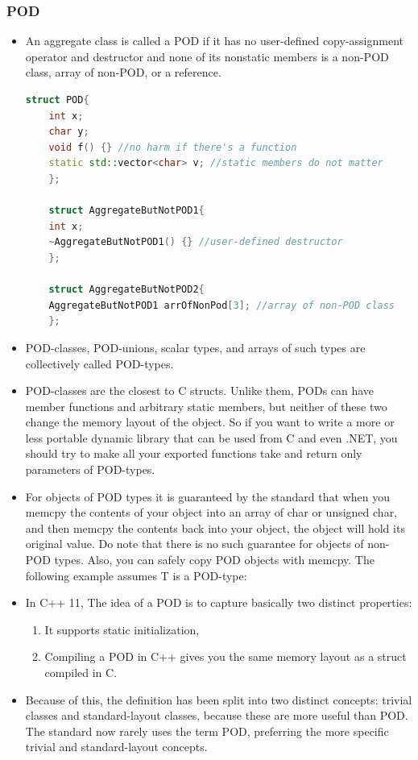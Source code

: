 \documentclass[a4paper,11pt,twoside]{book}
\begin{document}
\subsubsection{POD}
\begin{itemize}
	
	\item An aggregate class is called a POD if it has no user-defined copy-assignment operator and destructor and none of its nonstatic members is a non-POD class, array of non-POD, or a reference.
	
	\begin{lstlisting}[frame=single, language=c++]
	struct POD{
	int x;
	char y;
	void f() {} //no harm if there's a function
	static std::vector<char> v; //static members do not matter
	};
	
	struct AggregateButNotPOD1{
	int x;
	~AggregateButNotPOD1() {} //user-defined destructor
	};
	
	struct AggregateButNotPOD2{
	AggregateButNotPOD1 arrOfNonPod[3]; //array of non-POD class
	};
	\end{lstlisting}
	
	
	\item POD-classes, POD-unions, scalar types, and arrays of such types are collectively called POD-types.
	
	\item POD-classes are the closest to C structs. Unlike them, PODs can have member functions and arbitrary static members, but neither of these two change the memory layout of the object. So if you want to write a more or less portable dynamic library that can be used from C and even .NET, you should try to make all your exported functions take and return only parameters of POD-types.
	
	\item For objects of POD types it is guaranteed by the standard that when you memcpy the contents of your object into an array of char or unsigned char, and then memcpy the contents back into your object, the object will hold its original value. Do note that there is no such guarantee for objects of non-POD types. Also, you can safely copy POD objects with memcpy. The following example assumes T is a POD-type:
	
	
	\item In C++ 11, The idea of a POD is to capture basically two distinct properties:
	\begin{enumerate}
		\item It supports static initialization,
		\item Compiling a POD in C++ gives you the same memory layout as a struct compiled in C.
	\end{enumerate}
	
	\item Because of this, the definition has been split into two distinct concepts: trivial classes and standard-layout classes, because these are more useful than POD. The standard now rarely uses the term POD, preferring the more specific trivial and standard-layout concepts.
	
\end{itemize}
\end{document}
